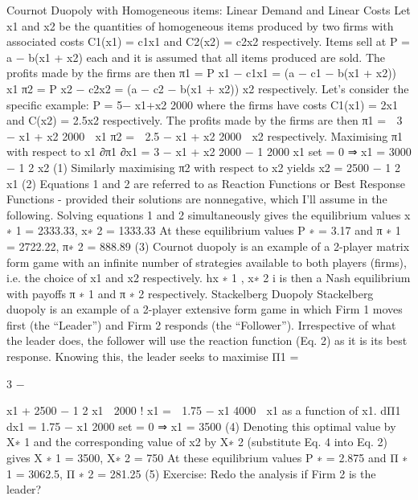 Cournot Duopoly with Homogeneous items: Linear Demand and Linear
Costs
Let x1 and x2 be the quantities of homogeneous items produced by two firms with associated
costs C1(x1) = c1x1 and C2(x2) = c2x2 respectively.
Items sell at P = a − b(x1 + x2) each and it is assumed that all items produced are sold.
The profits made by the firms are then
π1 = P x1 − c1x1 = (a − c1 − b(x1 + x2)) x1
π2 = P x2 − c2x2 = (a − c2 − b(x1 + x2)) x2
respectively.
Let’s consider the specific example: P = 5−
x1+x2
2000 where the firms have costs C1(x1) = 2x1
and C(x2) = 2.5x2 respectively.
The profits made by the firms are then
π1 =

3 −
x1 + x2
2000 
x1
π2 =

2.5 −
x1 + x2
2000 
x2
respectively.
Maximising π1 with respect to x1
∂π1
∂x1
= 3 −
x1 + x2
2000
−
1
2000
x1
set = 0
⇒ x1 = 3000 −
1
2
x2 (1)
Similarly maximising π2 with respect to x2 yields
x2 = 2500 −
1
2
x1 (2)
Equations 1 and 2 are referred to as Reaction Functions or Best Response Functions -
provided their solutions are nonnegative, which I’ll assume in the following.
Solving equations 1 and 2 simultaneously gives the equilibrium values
x
∗
1 = 2333.33, x∗
2 = 1333.33
At these equilibrium values
P
∗ = 3.17
and
π
∗
1 = 2722.22, π∗
2 = 888.89 (3)
Cournot duopoly is an example of a 2-player matrix form game with an infinite number
of strategies available to both players (firms), i.e. the choice of x1 and x2 respectively.
hx
∗
1
, x∗
2
i is then a Nash equilibrium with payoffs π
∗
1
and π
∗
2
respectively.
Stackelberg Duopoly
Stackelberg duopoly is an example of a 2-player extensive form game in which Firm 1
moves first (the “Leader”) and Firm 2 responds (the “Follower”). Irrespective of what
the leader does, the follower will use the reaction function (Eq. 2) as it is its best response.
Knowing this, the leader seeks to maximise
Π1 =

3 −

x1 + 2500 −
1
2
x1

2000 !
x1 =

1.75 −
x1
4000

x1
as a function of x1.
dΠ1
dx1
= 1.75 −
x1
2000
set = 0
⇒ x1 = 3500 (4)
Denoting this optimal value by X∗
1
and the corresponding value of x2 by X∗
2
(substitute
Eq. 4 into Eq. 2) gives
X
∗
1 = 3500, X∗
2 = 750
At these equilibrium values
P
∗ = 2.875
and
Π
∗
1 = 3062.5, Π
∗
2 = 281.25 (5)
Exercise: Redo the analysis if Firm 2 is the leader?
